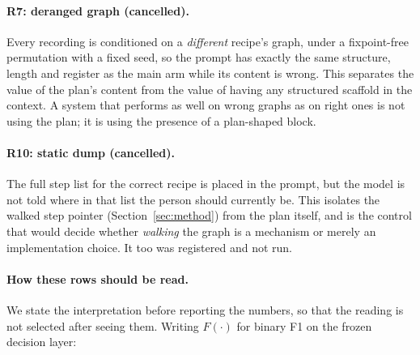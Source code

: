 \documentclass[10pt,twocolumn]{article}
\begin{document}
\paragraph{R7: deranged graph (cancelled).} Every recording is conditioned on a
\emph{different} recipe's graph, under a fixpoint-free permutation with a fixed
seed, so the prompt has exactly the same structure, length and register as the
main arm while its content is wrong. This separates the value of the plan's
content from the value of having any structured scaffold in the context. A
system that performs as well on wrong graphs as on right ones is not using the
plan; it is using the presence of a plan-shaped block.

\paragraph{R10: static dump (cancelled).} The full step list for the correct recipe is
placed in the prompt, but the model is not told where in that list the person
should currently be. This isolates the walked step pointer
(Section~\ref{sec:method}) from the plan itself, and is the control that would
decide whether \emph{walking} the graph is a mechanism or merely an
implementation choice. It too was registered and not run.

\paragraph{How these rows should be read.} We state the interpretation before
reporting the numbers, so that the reading is not selected after seeing them.
Writing $F(\cdot)$ for binary F1 on the frozen decision layer:
\end{document}
